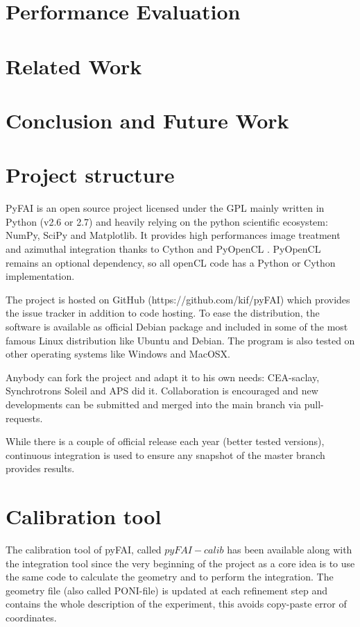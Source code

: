 \documentclass[preprint]{iucr}
\begin{document}
\section{Performance Evaluation} 
\section{Related Work}
\section{Conclusion and Future Work}






\appendix
\section{Project structure}
PyFAI is an open source project licensed under the GPL mainly written in Python (v2.6 or 2.7)
and heavily relying on the python scientific ecosystem: NumPy\cite{numpy},
SciPy\cite{scipy} and Matplotlib\cite{matplotlib}.
It provides high performances image treatment and azimuthal integration thanks
to Cython\cite{cython} and PyOpenCL \cite{pyopencl}. PyOpenCL remains an
optional dependency, so all openCL \cite{opencl} code has a Python or Cython
implementation.

The project is hosted on GitHub (https://github.com/kif/pyFAI) which provides
the issue tracker in addition to code hosting.
To ease the distribution, the
software is available as official Debian package and included in some of the
most famous Linux distribution like Ubuntu and Debian.
The program is also tested on other operating systems like Windows and
MacOSX.

Anybody can fork the project and adapt it to his own needs: CEA-saclay,
Synchrotrons Soleil and APS did it. Collaboration is encouraged and 
new developments can be submitted and merged into the main branch
via pull-requests. 

While there is a couple of official release each year (better
tested versions), continuous integration is used to ensure any snapshot of the
master branch provides  results.

\section{Calibration tool}
\label{annex_calib}

The calibration tool of pyFAI, called $pyFAI-calib$ has been available along
with the integration tool since the very beginning of the project as a core idea
is to use the same code to calculate the geometry and to perform the integration.
The geometry file (also called PONI-file) is updated at each refinement step and
contains the whole description of the experiment, this avoids copy-paste 
error of coordinates.
\end{document}
